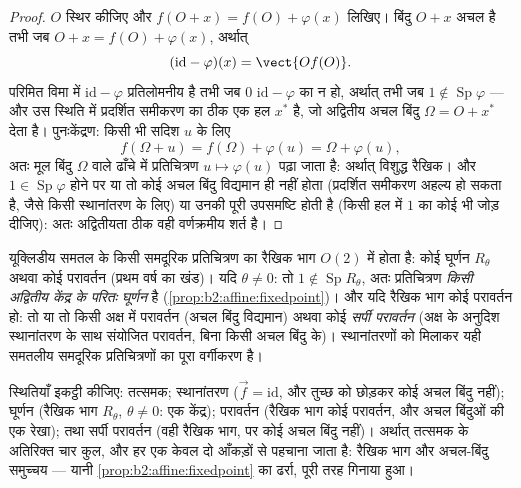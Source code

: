 \begin{proof}
$O$ स्थिर कीजिए और $f(O + x) = f(O) + \varphi(x)$ लिखिए। बिंदु $O + x$ अचल है तभी जब $O + x = f(O) + \varphi(x)$, अर्थात्
\[
(\mathrm{id} - \varphi)(x) = \vect{O f(O)} .
\]
परिमित विमा में $\mathrm{id} - \varphi$ प्रतिलोमनीय है तभी जब $0$ $\mathrm{id} - \varphi$ का  न हो,
अर्थात् तभी जब $1 \notin \operatorname{Sp}\varphi$ --- और उस स्थिति में प्रदर्शित समीकरण का ठीक एक हल $x^*$
है, जो अद्वितीय अचल बिंदु $\Omega = O + x^*$ देता है। पुनःकेंद्रण: किसी भी सदिश $u$ के
लिए
\[
f(\Omega + u) = f(\Omega) + \varphi(u) = \Omega + \varphi(u),
\]
अतः मूल बिंदु $\Omega$ वाले ढाँचे में प्रतिचित्रण $u \mapsto
\varphi(u)$ पढ़ा जाता है: अर्थात्
विशुद्ध रैखिक। और $1 \in
\operatorname{Sp}\varphi$ होने पर या तो कोई अचल बिंदु विद्यमान ही नहीं होता
(प्रदर्शित समीकरण अहल्य हो सकता है, जैसे किसी स्थानांतरण के लिए) या उनकी
पूरी  उपसमष्टि होती है (किसी हल में  $1$ का कोई भी
 जोड़ दीजिए): अतः अद्वितीयता ठीक वही वर्णक्रमीय शर्त है।
\end{proof}

\begin{example}\label{ex:b2:affine:isometries}
यूक्लिडीय समतल के किसी  समदूरिक प्रतिचित्रण का रैखिक भाग $O(2)$ में होता
है: कोई घूर्णन $R_\theta$ अथवा कोई परावर्तन (प्रथम वर्ष का खंड)। यदि $\theta \neq 0$: तो $1 \notin \operatorname{Sp} R_\theta$,
अतः प्रतिचित्रण \emph{किसी अद्वितीय केंद्र के परितः घूर्णन} है (\cref{prop:b2:affine:fixedpoint})। और
यदि रैखिक भाग कोई परावर्तन हो: तो या तो किसी अक्ष में परावर्तन (अचल बिंदु
विद्यमान) अथवा कोई \emph{सर्पी परावर्तन} (अक्ष के अनुदिश स्थानांतरण के साथ
संयोजित परावर्तन, बिना किसी अचल बिंदु के)। स्थानांतरणों को मिलाकर यही
समतलीय समदूरिक प्रतिचित्रणों का पूरा वर्गीकरण है।
\end{example}

\begin{remark}
स्थितियाँ इकट्ठी कीजिए: तत्समक; स्थानांतरण ($\vec f =
\mathrm{id}$, और तुच्छ को छोड़कर कोई
अचल बिंदु नहीं); घूर्णन (रैखिक भाग $R_\theta$, $\theta \neq 0$: एक केंद्र); परावर्तन (रैखिक
भाग कोई परावर्तन, और अचल बिंदुओं की एक रेखा); तथा सर्पी परावर्तन (वही
रैखिक भाग, पर कोई अचल बिंदु नहीं)। अर्थात् तत्समक के अतिरिक्त चार कुल, और
हर एक केवल दो आँकड़ों से पहचाना जाता है: रैखिक भाग और अचल-बिंदु समुच्चय ---
यानी \cref{prop:b2:affine:fixedpoint} का ढर्रा, पूरी तरह गिनाया हुआ।
\end{remark}

